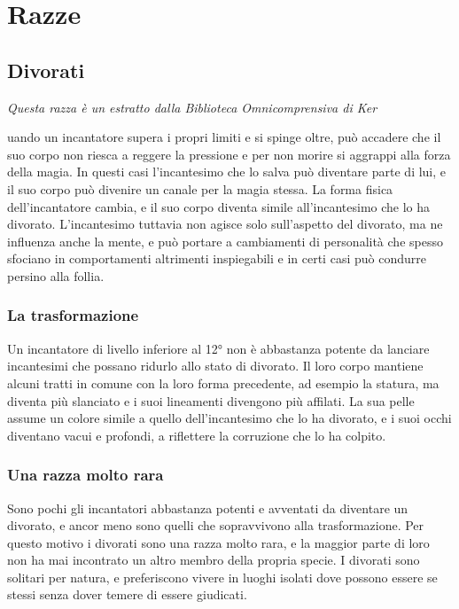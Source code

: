 \chapter{Razze}

\section{Divorati}

\textit{Questa razza è un estratto dalla Biblioteca Omnicomprensiva di Ker}

uando un incantatore supera i propri limiti e si spinge oltre, può accadere che il suo corpo non riesca a reggere la pressione e per non morire si aggrappi alla forza della magia. In questi casi l'incantesimo che lo salva può diventare parte di lui, e il suo corpo può divenire un canale per la magia stessa. La forma fisica dell'incantatore cambia, e il suo corpo diventa simile all'incantesimo che lo ha divorato. L'incantesimo tuttavia non agisce solo sull'aspetto del divorato, ma ne influenza anche la mente, e può portare a cambiamenti di personalità che spesso sfociano in comportamenti altrimenti inspiegabili e in certi casi può condurre persino alla follia.

\subsection{La trasformazione}
Un incantatore di livello inferiore al 12° non è abbastanza potente da lanciare incantesimi che possano ridurlo allo stato di divorato. Il loro corpo mantiene alcuni tratti in comune con la loro forma precedente, ad esempio la statura, ma diventa più slanciato e i suoi lineamenti divengono più affilati. La sua pelle assume un colore simile a quello dell'incantesimo che lo ha divorato, e i suoi occhi diventano vacui e profondi, a riflettere la corruzione che lo ha colpito.

\subsection{Una razza molto rara}
Sono pochi gli incantatori abbastanza potenti e avventati da diventare un divorato, e ancor meno sono quelli che sopravvivono alla trasformazione. Per questo motivo i divorati sono una razza molto rara, e la maggior parte di loro non ha mai incontrato un altro membro della propria specie. I divorati sono solitari per natura, e preferiscono vivere in luoghi isolati dove possono essere se stessi senza dover temere di essere giudicati.

